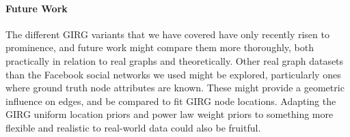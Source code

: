 

\paragraph{Future Work}
The different GIRG variants that we have covered have only recently risen to prominence, and future work might compare them more thoroughly, both practically in relation to real graphs and theoretically.
Other real graph datasets than the Facebook social networks we used might be explored, particularly ones where ground truth node attributes are known. These might provide a geometric influence on edges, and be compared to fit GIRG node locations.
Adapting the GIRG uniform location priors and power law weight priors to something more flexible and realistic to real-world data could also be fruitful.


